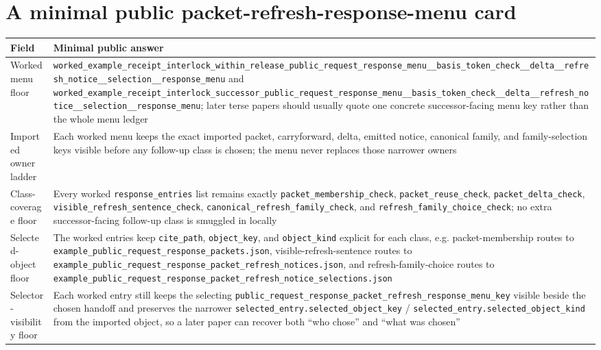 \documentclass[11pt]{article}
\begin{document}
\section{A minimal public packet-refresh-response-menu card}
\begin{table}[t]
\centering
\small
\begin{tabularx}{\linewidth}{@{}lX@{}}
\toprule
Field & Minimal public answer \\
\midrule
Worked menu floor & \nolinkurl{worked_example_receipt_interlock_within_release_public_request_response_menu__basis_token_check__delta__refresh_notice__selection__response_menu} and \nolinkurl{worked_example_receipt_interlock_successor_public_request_response_menu__basis_token_check__delta__refresh_notice__selection__response_menu}; later terse papers should usually quote one concrete successor-facing menu key rather than the whole menu ledger \\
Imported owner ladder & Each worked menu keeps the exact imported packet, carryforward, delta, emitted notice, canonical family, and family-selection keys visible before any follow-up class is chosen; the menu never replaces those narrower owners \\
Class-coverage floor & Every worked \nolinkurl{response_entries} list remains exactly \nolinkurl{packet_membership_check}, \nolinkurl{packet_reuse_check}, \nolinkurl{packet_delta_check}, \nolinkurl{visible_refresh_sentence_check}, \nolinkurl{canonical_refresh_family_check}, and \nolinkurl{refresh_family_choice_check}; no extra successor-facing follow-up class is smuggled in locally \\
Selected-object floor & The worked entries keep \nolinkurl{cite_path}, \nolinkurl{object_key}, and \nolinkurl{object_kind} explicit for each class, e.g. packet-membership routes to \nolinkurl{example_public_request_response_packets.json}, visible-refresh-sentence routes to \nolinkurl{example_public_request_response_packet_refresh_notices.json}, and refresh-family-choice routes to \nolinkurl{example_public_request_response_packet_refresh_notice_selections.json} \\
Selector-visibility floor & Each worked entry still keeps the selecting \nolinkurl{public_request_response_packet_refresh_response_menu_key} visible beside the chosen handoff and preserves the narrower \nolinkurl{selected_entry.selected_object_key} / \nolinkurl{selected_entry.selected_object_kind} from the imported object, so a later paper can recover both ``who chose'' and ``what was chosen'' \\

\end{tabularx}
\end{table}
\end{document}
